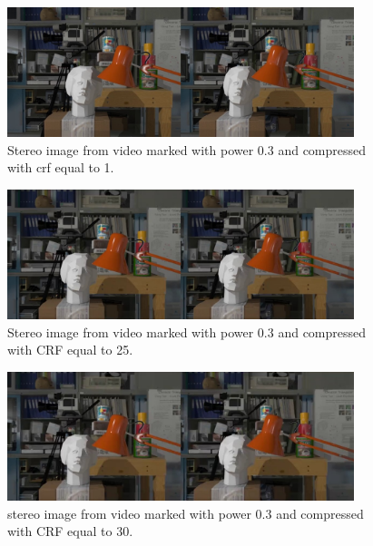 \begin{figure}[h!]
\centering
\includegraphics[width=0.9\textwidth]{./img/03_crf1_gt.jpg}
\caption{\small{Stereo image from video marked with power 0.3 and compressed with crf equal to 1. }}
\label{fig:03crf1}
\end{figure}
\begin{figure}[h!]
\centering
\includegraphics[width=0.9\textwidth]{./img/03_crf25_gt.jpg}
\caption{\small{Stereo image from video marked with power 0.3 and compressed with CRF equal to 25. }}
\label{fig:03crf25}
\end{figure}
\begin{figure}[h!]
\centering
\includegraphics[width=0.9\textwidth]{./img/03_crf30_gt.jpg}
\caption{\small{stereo image from video marked with power 0.3 and compressed with CRF equal to 30. }}
\label{fig:03crf30}
\end{figure}


